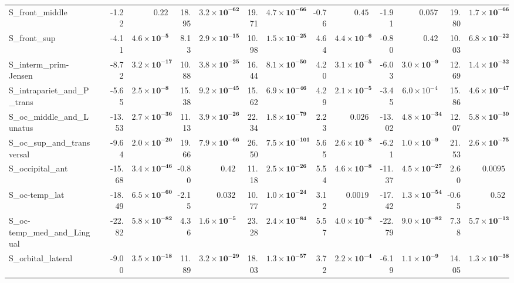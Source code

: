 {\begin{longtable}{llrrrrrrrrrrrr}
S\_front\_middle &  & -1.22 & $0.22$ & 18.95 & $\mathbf{3.2{\times}10^{-62}}$ & 19.71 & $\mathbf{4.7{\times}10^{-66}}$ & -0.76 & $0.45$ & -1.91 & $0.057$ & 19.80 & $\mathbf{1.7{\times}10^{-66}}$ \\
S\_front\_sup &  & -4.11 & $\mathbf{4.6{\times}10^{-5}}$ & 8.13 & $\mathbf{2.9{\times}10^{-15}}$ & 10.98 & $\mathbf{1.5{\times}10^{-25}}$ & 4.64 & $\mathbf{4.4{\times}10^{-6}}$ & -0.80 & $0.42$ & 10.03 & $\mathbf{6.8{\times}10^{-22}}$ \\
S\_interm\_prim-Jensen &  & -8.72 & $\mathbf{3.2{\times}10^{-17}}$ & 10.88 & $\mathbf{3.8{\times}10^{-25}}$ & 16.44 & $\mathbf{8.1{\times}10^{-50}}$ & 4.20 & $\mathbf{3.1{\times}10^{-5}}$ & -6.03 & $\mathbf{3.0{\times}10^{-9}}$ & 12.69 & $\mathbf{1.4{\times}10^{-32}}$ \\
S\_intrapariet\_and\_P\_trans &  & -5.65 & $\mathbf{2.5{\times}10^{-8}}$ & 15.38 & $\mathbf{9.2{\times}10^{-45}}$ & 15.62 & $\mathbf{6.9{\times}10^{-46}}$ & 4.29 & $\mathbf{2.1{\times}10^{-5}}$ & -3.45 & $6.0{\times}10^{-4}$ & 15.86 & $\mathbf{4.6{\times}10^{-47}}$ \\
S\_oc\_middle\_and\_Lunatus &  & -13.53 & $\mathbf{2.7{\times}10^{-36}}$ & 11.13 & $\mathbf{3.9{\times}10^{-26}}$ & 22.34 & $\mathbf{1.8{\times}10^{-79}}$ & 2.23 & $0.026$ & -13.02 & $\mathbf{4.8{\times}10^{-34}}$ & 12.07 & $\mathbf{5.8{\times}10^{-30}}$ \\
S\_oc\_sup\_and\_transversal &  & -9.64 & $\mathbf{2.0{\times}10^{-20}}$ & 19.66 & $\mathbf{7.9{\times}10^{-66}}$ & 26.50 & $\mathbf{7.5{\times}10^{-101}}$ & 5.65 & $\mathbf{2.6{\times}10^{-8}}$ & -6.21 & $\mathbf{1.0{\times}10^{-9}}$ & 21.53 & $\mathbf{2.6{\times}10^{-75}}$ \\
S\_occipital\_ant &  & -15.68 & $\mathbf{3.4{\times}10^{-46}}$ & -0.80 & $0.42$ & 11.18 & $\mathbf{2.5{\times}10^{-26}}$ & 5.54 & $\mathbf{4.6{\times}10^{-8}}$ & -11.37 & $\mathbf{4.5{\times}10^{-27}}$ & 2.60 & $0.0095$ \\
S\_oc-temp\_lat &  & -18.49 & $\mathbf{6.5{\times}10^{-60}}$ & -2.15 & $0.032$ & 10.77 & $\mathbf{1.0{\times}10^{-24}}$ & 3.12 & $0.0019$ & -17.42 & $\mathbf{1.3{\times}10^{-54}}$ & -0.65 & $0.52$ \\
S\_oc-temp\_med\_and\_Lingual &  & -22.82 & $\mathbf{5.8{\times}10^{-82}}$ & 4.36 & $\mathbf{1.6{\times}10^{-5}}$ & 23.28 & $\mathbf{2.4{\times}10^{-84}}$ & 5.57 & $\mathbf{4.0{\times}10^{-8}}$ & -22.79 & $\mathbf{9.0{\times}10^{-82}}$ & 7.38 & $\mathbf{5.7{\times}10^{-13}}$ \\
S\_orbital\_lateral &  & -9.00 & $\mathbf{3.5{\times}10^{-18}}$ & 11.89 & $\mathbf{3.2{\times}10^{-29}}$ & 18.03 & $\mathbf{1.3{\times}10^{-57}}$ & 3.72 & $\mathbf{2.2{\times}10^{-4}}$ & -6.19 & $\mathbf{1.1{\times}10^{-9}}$ & 14.05 & $\mathbf{1.3{\times}10^{-38}}$ \\

\end{longtable}}
